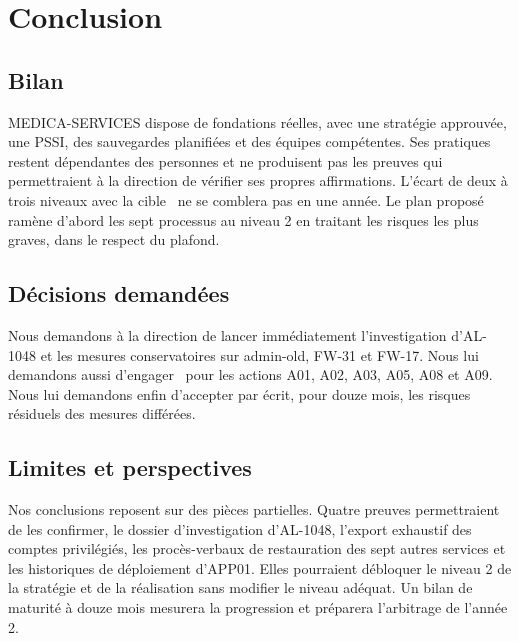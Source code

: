 \section{Conclusion}

\subsection{Bilan}

MEDICA-SERVICES dispose de fondations réelles, avec une stratégie approuvée, une PSSI, des sauvegardes planifiées et des équipes compétentes. Ses pratiques restent dépendantes des personnes et ne produisent pas les preuves qui permettraient à la direction de vérifier ses propres affirmations. L'écart de deux à trois niveaux avec la cible \Cible\ ne se comblera pas en une année. Le plan proposé ramène d'abord les sept processus au niveau 2 en traitant les risques les plus graves, dans le respect du plafond.

\subsection{Décisions demandées}

Nous demandons à la direction de lancer immédiatement l'investigation d'AL-1048 et les mesures conservatoires sur admin-old, FW-31 et FW-17. Nous lui demandons aussi d'engager \TotalRetenu\ pour les actions A01, A02, A03, A05, A08 et A09. Nous lui demandons enfin d'accepter par écrit, pour douze mois, les risques résiduels des mesures différées.

\subsection{Limites et perspectives}

Nos conclusions reposent sur des pièces partielles. Quatre preuves permettraient de les confirmer, le dossier d'investigation d'AL-1048, l'export exhaustif des comptes privilégiés, les procès-verbaux de restauration des sept autres services et les historiques de déploiement d'APP01. Elles pourraient débloquer le niveau 2 de la stratégie et de la réalisation sans modifier le niveau adéquat. Un bilan de maturité à douze mois mesurera la progression et préparera l'arbitrage de l'année 2.
